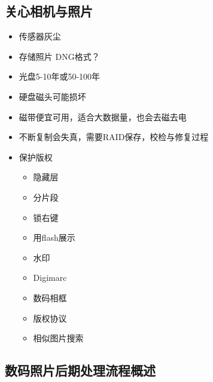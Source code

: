 \documentclass[
  letterpaper,
  DIV=11,
  numbers=noendperiod]{scrreprt}
\providecommand{\tightlist}{%
  \setlength{\itemsep}{0pt}\setlength{\parskip}{0pt}}\usepackage{longtable,booktabs,array}
\begin{document}
\subsection{关心相机与照片}\label{ux5173ux5fc3ux76f8ux673aux4e0eux7167ux7247}

\begin{itemize}
\tightlist
\item
  传感器灰尘
\item
  存储照片 DNG格式？
\item
  光盘5-10年或50-100年
\item
  硬盘磁头可能损坏
\item
  磁带便宜可用，适合大数据量，也会去磁去电
\item
  不断复制会失真，需要RAID保存，校检与修复过程
\item
  保护版权

  \begin{itemize}
  \tightlist
  \item
    隐藏层
  \item
    分片段
  \item
    锁右键
  \item
    用flash展示
  \item
    水印
  \item
    Digimarc
  \item
    数码相框
  \item
    版权协议
  \item
    相似图片搜索
  \end{itemize}
\end{itemize}

\subsection{数码照片后期处理流程概述}\label{ux6570ux7801ux7167ux7247ux540eux671fux5904ux7406ux6d41ux7a0bux6982ux8ff0}
\end{document}
